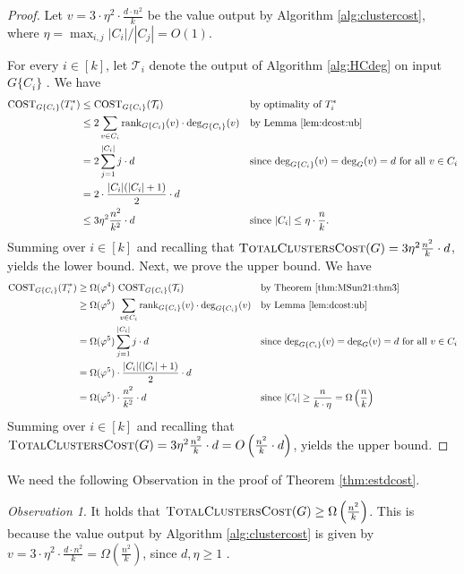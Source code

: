 \documentclass[letterpaper,11pt]{article}
\newcommand{\rank}{\mathrm{rank}}
\theoremstyle{plain}
\theoremstyle{definition}
\theoremstyle{remark}
\newtheorem{observation}{Observation}
\begin{document}
\totalclustercost*
\begin{proof}
Let $v = 3 \cdot \eta^2 \cdot \frac{d \cdot n^2}{k}$ be the value output by Algorithm \ref{alg:clustercost}, where $\eta = \max_{i,j}|C_i|/|C_j| =  O(1)$. 

For every $i \in [k]$, let $\mathcal T_i$ denote the output of Algorithm \ref{alg:HCdeg} on input $G\{C_i\}$ . 
We have
\begin{align*}
\text{COST}_{G\{C_i\}}(T^*_i) & \leq \text{COST}_{G\{C_i\}}(\mathcal T_i)  && \text{by optimality of $T^*_i$} \\
& \leq 2 \sum_{v \in C_i} \rank_{G\{C_i\}}(v) \cdot \deg_{G\{C_i\}}(v) && \text{by Lemma  \ref{lem:dcost:ub}} \\
& =2 \sum_{j =1}^{|C_i|}j \cdot d && \text{since $\deg_{G\{C_i\}}(v) = \deg_G(v) = d$ for all $v \in C_i$} \\
& = 2 \cdot \frac{|C_i|(|C_i|+1)}{2}\cdot d \\
& \leq 3 \eta^2 \frac{n^2}{k^2}\cdot d && \text{since $|C_i| \leq \eta \cdot \frac{n}{k}$}. 
\end{align*}
Summing over $i \in [k]$ and recalling that $\textsc{TotalClustersCost}(G) = 3 \eta^2 \frac{n^2}{k}\cdot d$, yields the lower bound. 
Next, we prove the upper bound. We have 
\begin{align*}
\text{COST}_{G\{C_i\}}(T^*_i)&  \geq \Omega(\varphi^4)\ \text{COST}_{G\{C_i\}}(\mathcal T_i) && \text{by Theorem \ref{thm:MSun21:thm3}} \\
& \geq  \Omega(\varphi^5)\ \sum_{v \in C_i} \rank_{G\{C_i\}}(v) \cdot \deg_{G\{C_i\}}(v)  && \text{by Lemma \ref{lem:dcost:ub}} \\
& = \Omega(\varphi^5) \sum_{j = 1}^{|C_i|}j \cdot d && \text{since $\deg_{G\{C_i\}}(v) = \deg_G(v) = d$ for all $v \in C_i$}\\
& =  \Omega(\varphi^5)  \cdot \frac{|C_i|(|C_i|+1)}{2}\cdot d &&  \\
& = \Omega(\varphi^5)\cdot \frac{n^2}{k^2}\cdot d && \text{since $|C_i| \geq \frac{n}{k \cdot \eta } = \Omega\left(\frac{n}{k} \right)$}
\end{align*}
Summing over $i \in [k]$ and recalling that $\textsc{TotalClustersCost}(G) = 3 \eta^2 \frac{n^2}{k}\cdot d = O\left( \frac{n^2}{k} \cdot d \right)$, yields the upper bound. 
\end{proof}
We need the following Observation in the proof of Theorem \ref{thm:estdcost}.
\begin{observation}
    \label{lem:lw-cost-exp}
	It holds that $\textsc{TotalClustersCost}(G) \geq \Omega\left(\frac{n^2}{k}\right)$. This is because the value output by Algorithm \ref{alg:clustercost} is given by $v = 3 \cdot \eta^2 \cdot \frac{d \cdot n^2}{k} =  \Omega\left(\frac{n^2}{k}\right)$, since $d, \eta  \geq 1$ . 
\end{observation}
\end{document}
